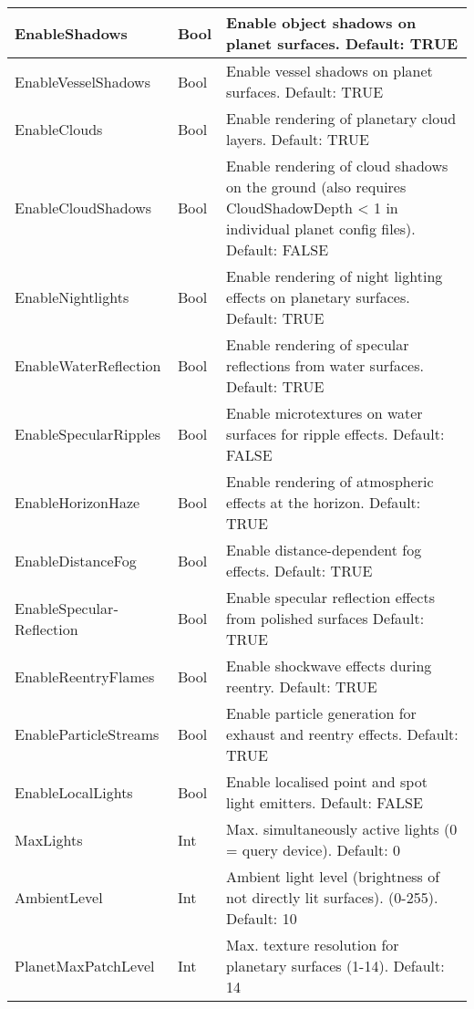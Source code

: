 \documentclass[Orbiter Developer Manual.tex]{subfiles}
\begin{document}
\begin{longtable}{ |p{}|p{}|p{}| }
	\hline\rule{0pt}{2ex}
	EnableShadows & Bool & Enable object shadows on planet surfaces. Default: TRUE\\
	\hline\rule{0pt}{2ex}
	EnableVesselShadows & Bool & Enable vessel shadows on planet surfaces. Default: TRUE\\
	\hline\rule{0pt}{2ex}
	EnableClouds & Bool & Enable rendering of planetary cloud layers. Default: TRUE\\
	\hline\rule{0pt}{2ex}
	EnableCloudShadows & Bool & Enable rendering of cloud shadows on the ground (also requires CloudShadowDepth < 1 in individual planet config files). Default: FALSE\\
	\hline\rule{0pt}{2ex}
	EnableNightlights & Bool & Enable rendering of night lighting effects on planetary surfaces. Default: TRUE\\
	\hline\rule{0pt}{2ex}
	EnableWaterReflection & Bool & Enable rendering of specular reflections from water surfaces. Default: TRUE\\
	\hline\rule{0pt}{2ex}
	EnableSpecularRipples & Bool & Enable microtextures on water surfaces for ripple effects. Default: FALSE\\
	\hline\rule{0pt}{2ex}
	EnableHorizonHaze & Bool & Enable rendering of atmospheric effects at the horizon. Default: TRUE\\
	\hline\rule{0pt}{2ex}
	EnableDistanceFog & Bool & Enable distance-dependent fog effects. Default: TRUE\\
	\hline\rule{0pt}{2ex}
	EnableSpecular­Reflection & Bool & Enable specular reflection effects from polished surfaces Default: TRUE\\
	\hline\rule{0pt}{2ex}
	EnableReentryFlames & Bool & Enable shockwave effects during reentry. Default: TRUE\\
	\hline\rule{0pt}{2ex}
	EnableParticleStreams & Bool & Enable particle generation for exhaust and reentry effects. Default: TRUE\\
	\hline\rule{0pt}{2ex}
	EnableLocalLights & Bool & Enable localised point and spot light emitters. Default: FALSE\\
	\hline\rule{0pt}{2ex}
	MaxLights & Int & Max. simultaneously active lights (0 = query device). Default: 0\\
	\hline\rule{0pt}{2ex}
	AmbientLevel & Int & Ambient light level (brightness of not directly lit surfaces). (0-255). Default: 10\\
	\hline\rule{0pt}{2ex}
	PlanetMaxPatchLevel & Int & Max. texture resolution for planetary surfaces (1-14). Default: 14\\

\end{longtable}
\end{document}

